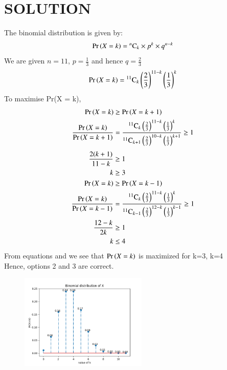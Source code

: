 \documentclass[journal,12pt,twocolumn]{IEEEtran}
\begin{document}
\section{\textbf{SOLUTION}}
The binomial distribution is given by:
\begin{equation}
\Pr\left(X=k\right)={}^{n}\mathrm{C}_{k}\times p^k\times q^{n-k}
\end{equation}
We are given $n=11$, $p=\frac{1}{3}$ and hence $q=\frac{2}{3}$
\begin{align}
\Pr\left(X = k\right)={{}^{11}\mathrm{C}_{k}}\left(\frac{2}{3}\right)^{11-k}\left(\frac{1}{3}\right)^{k}
\end{align}
To maximise Pr(X = k),
\begin{align}
\Pr\left(X = k\right)&\geq\Pr\left(X = k+1\right)\\
\frac{\Pr\left(X = k\right)}{\Pr\left(X = k+1\right)}&=\frac{{{}^{11}\mathrm{C}_{k}}\left(\frac{2}{3}\right)^{11-k}\left(\frac{1}{3}\right)^{k}}{{{}^{11}\mathrm{C}_{k+1}}\left(\frac{2}{3}\right)^{10-k}\left(\frac{1}{3}\right)^{k+1}}\geq1
\end{align}
\begin{align}
\frac{2(k+1)}{11-k}&\geq1\\
k&\geq3\\
\Pr\left(X = k\right)&\geq\Pr\left(X = k-1\right)\\
\frac{\Pr\left(X = k\right)}{\Pr\left(X = k-1\right)}&=\frac{{{}^{11}\mathrm{C}_{k}}\left(\frac{2}{3}\right)^{11-k}\left(\frac{1}{3}\right)^{k}}{{{}^{11}\mathrm{C}_{k-1}}\left(\frac{2}{3}\right)^{12-k}\left(\frac{1}{3}\right)^{k-1}}\geq1\\
\frac{12-k}{2k}&\geq1\\
k&\leq4
\end{align}
From equations  and  we see that $\Pr\left(X = k\right)$ is maximized for k=3, k=4\\
Hence, options 2 and 3 are correct.\\
\begin{figure}[!htb]
\centering
\includegraphics[width =0.54\textwidth]{Binomial-stemplot.png}
\end{figure}
\end{document}
